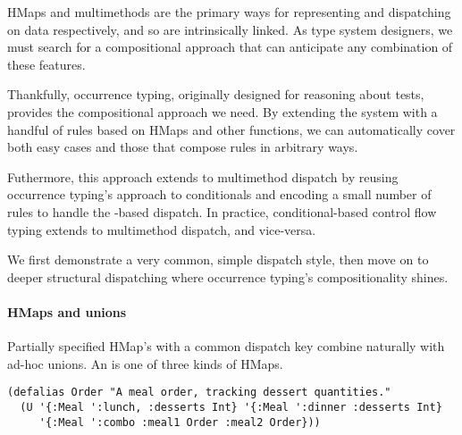 HMaps and multimethods are the primary ways for representing
and dispatching on data respectively, and so are intrinsically linked.
As type system designers, we must
search for a compositional approach that can anticipate
any combination of these features.

Thankfully, occurrence typing, originally designed for reasoning about
 tests, provides the compositional approach we need.
By extending the system with
a handful of rules based on HMaps and other functions, 
we can automatically cover both easy cases and those
that compose rules in arbitrary ways.

Futhermore, this approach extends to multimethod dispatch by reusing
occurrence typing's approach to conditionals
and
encoding a small number of rules to handle
the -based dispatch.
In practice, conditional-based control flow typing
extends to multimethod dispatch, and vice-versa.

We first demonstrate a very common, simple dispatch style,
then move on to deeper structural dispatching where occurrence typing's
compositionality shines.

\paragraph{HMaps and unions} Partially specified HMap's with a common dispatch key
combine naturally with ad-hoc unions.
An  is one of three kinds of HMaps.


\begin{verbatim}
(defalias Order "A meal order, tracking dessert quantities."
  (U '{:Meal ':lunch, :desserts Int} '{:Meal ':dinner :desserts Int}
     '{:Meal ':combo :meal1 Order :meal2 Order}))
\end{verbatim}

